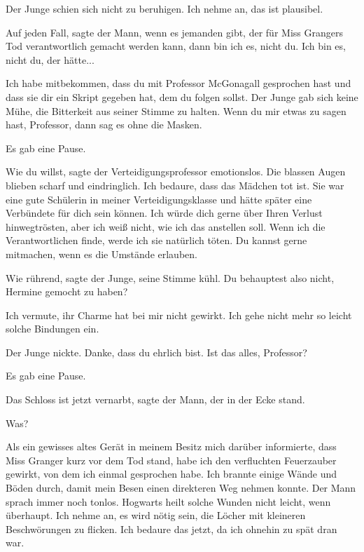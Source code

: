Der Junge schien sich nicht zu beruhigen. \glqq Ich nehme an, das ist
plausibel.\grqq{}

\glqq Auf jeden Fall\grqq{}, sagte der Mann, \glqq wenn es jemanden gibt, der
für Miss Grangers Tod verantwortlich gemacht werden kann, dann bin ich es, nicht
du. Ich bin es, nicht du, der hätte...\grqq{}

\glqq Ich habe mitbekommen, dass du mit Professor McGonagall gesprochen hast und
dass sie dir ein Skript gegeben hat, dem du folgen sollst.\grqq{} Der Junge gab
sich keine Mühe, die Bitterkeit aus seiner Stimme zu halten. \glqq Wenn du mir
etwas zu sagen hast, Professor, dann sag es ohne die Masken.\grqq{}

Es gab eine Pause.

\glqq Wie du willst\grqq{}, sagte der Verteidigungsprofessor emotionslos. Die
blassen Augen blieben scharf und eindringlich. \glqq Ich bedaure, dass das
Mädchen tot ist. Sie war eine gute Schülerin in meiner Verteidigungsklasse und
hätte später eine Verbündete für dich sein können. Ich würde dich gerne über
Ihren Verlust hinwegtrösten, aber ich weiß nicht, wie ich das anstellen soll.
Wenn ich die Verantwortlichen finde, werde ich sie natürlich töten. Du kannst
gerne mitmachen, wenn es die Umstände erlauben.\grqq{}

\glqq Wie rührend\grqq{}, sagte der Junge, seine Stimme kühl. \glqq Du
behauptest also nicht, Hermine gemocht zu haben?\grqq{}

\glqq Ich vermute, ihr Charme hat bei mir nicht gewirkt. Ich gehe nicht mehr so
leicht solche Bindungen ein.\grqq{}

Der Junge nickte. \glqq Danke, dass du ehrlich bist. Ist das alles,
Professor?\grqq{}

Es gab eine Pause.

\glqq Das Schloss ist jetzt vernarbt\grqq{}, sagte der Mann, der in der Ecke
stand.

\glqq Was?\grqq{}

\glqq Als ein gewisses altes Gerät in meinem Besitz mich darüber informierte,
dass Miss Granger kurz vor dem Tod stand, habe ich den verfluchten Feuerzauber
gewirkt, von dem ich einmal gesprochen habe. Ich brannte einige Wände und Böden
durch, damit mein Besen einen direkteren Weg nehmen konnte.\grqq{} Der Mann
sprach immer noch tonlos. \glqq Hogwarts heilt solche Wunden nicht leicht, wenn
überhaupt. Ich nehme an, es wird nötig sein, die Löcher mit kleineren
Beschwörungen zu flicken. Ich bedaure das jetzt, da ich ohnehin zu spät dran
war.\grqq{}

